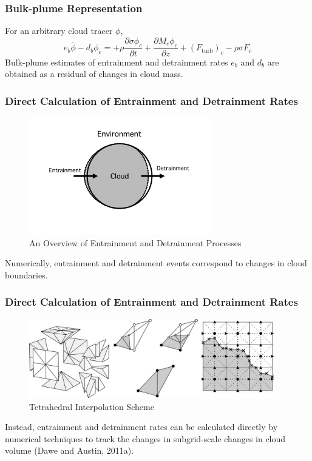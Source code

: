 \documentclass{beamer}
\begin{document}
\begin{frame}
    \frametitle{Bulk-plume Representation}
    For an arbitrary cloud tracer $\phi$,
    \begin{equation}
        e_b \overline{\phi} - d_b \phi_c =
            + \rho \frac{\partial \sigma \phi_c}{\partial t}
            + \frac{\partial M_c \phi_c}{\partial z}
            + (F_\mathrm{turb})_c
            - \rho \sigma F_c
    \end{equation}
    Bulk-plume estimates of entrainment and detrainment rates $e_b$ and $d_b$ are obtained as a residual of changes in cloud mass.
\end{frame}

\begin{frame}
    \frametitle{Direct Calculation of Entrainment and Detrainment Rates}
    \begin{figure}
        \centering
        \includegraphics[width=0.7\textwidth]{img/ed.pdf}
        \caption{ An Overview of Entrainment and Detrainment Processes }
    \end{figure}
    Numerically, entrainment and detrainment events correspond to changes in cloud boundaries.
\end{frame}

\begin{frame}
    \frametitle{Direct Calculation of Entrainment and Detrainment Rates}
    \begin{figure}
        \centering
        \includegraphics[width=0.95\textwidth]{img/tetra.png}
        \caption{ Tetrahedral Interpolation Scheme }
    \end{figure}
    Instead, entrainment and detrainment rates can be calculated directly by numerical techniques to track the changes in subgrid-scale changes in cloud volume (Dawe and Austin, 2011a).
\end{frame}
\end{document}
